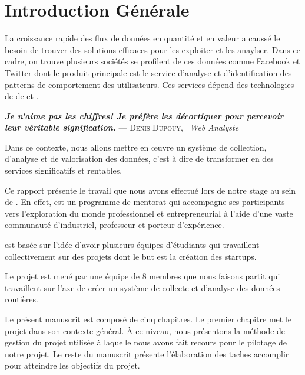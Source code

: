 \chapter*{Introduction Générale}

La croissance rapide des flux de données en quantité et en valeur a caussé le
besoin de trouver des solutions efficaces pour les exploiter et les anaylser.
Dans ce cadre, on trouve plusieurs sociétés se profilent de ces données comme
Facebook et Twitter dont le produit principale est le service d'analyse et
d'identification des patterns de comportement des utilisateurs. Ces services
dépend des technologies de de  et .


\begin{center}
\textbf{\textit{Je n’aime pas les chiffres! Je préfère les décortiquer pour
percevoir leur véritable signification.}} \linebreak
\hfill --- \textsc{Denis Dupouy}, \ \textit{Web Analyste}
\end{center}

Dans ce contexte, nous allons mettre en \oe{}uvre un système de
collection, d'analyse et de valorisation des données, c'est à dire de transformer
en des services significatifs et rentables.

Ce rapport présente le travail que nous avons effectué lors de notre stage au
sein de . En effet,  est
un programme de mentorat qui accompagne ses participants vers l'exploration du monde
professionnel et entrepreneurial à l'aide d'une vaste communauté d'industriel,
professeur et porteur d'expérience.

 est basée sur l'idée d'avoir plusieurs équipes d'étudiants
qui travaillent collectivement sur des projets dont le but est la création des
startups.

Le projet  est mené par une équipe de 8 membres que nous faisons partit
qui travaillent sur l'axe de créer un système de collecte et d'analyse
des données routières.

Le présent manuscrit est composé de cinq chapitres. Le premier chapitre met le
projet dans son contexte général. À ce niveau, nous présentons la méthode de
gestion du projet utilisée à laquelle nous avons fait recours pour le pilotage
de notre projet. Le reste du manuscrit présente l'élaboration des taches
accomplir pour atteindre les objectifs du projet.
